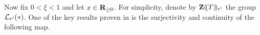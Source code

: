 %

%
%

Now fix $0< \xi<1$ and let $x\in\mathbf{R}_{\geq 0}$. For simplicity, denote by $\mathbf{Z}(\!(T)\!)_{r'}$ the group $\mathcal L_{r'}(\ast)$.
One of the key results proven in \cite[\S 6]{Analytic} is the surjectivity and continuity of the following map.

